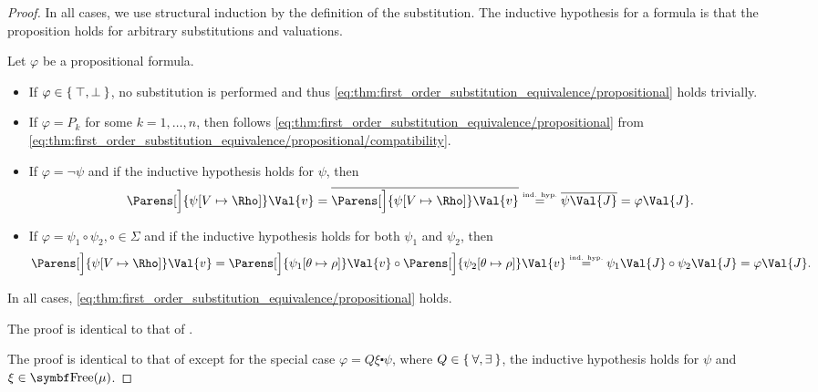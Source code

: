 \begin{proof}
  In all cases, we use structural induction by the definition of the substitution\IND. The inductive hypothesis for a formula is that the proposition holds for arbitrary substitutions and valuations.

   Let \( \varphi \) be a propositional formula.
  \begin{itemize}
    \item If \( \varphi \in \Set{ \top, \bot } \), no substitution is performed and thus \eqref{eq:thm:first_order_substitution_equivalence/propositional} holds trivially.

    \item If \( \varphi = P_k \) for some \( k = 1, \ldots, n \), then follows \eqref{eq:thm:first_order_substitution_equivalence/propositional} from \eqref{eq:thm:first_order_substitution_equivalence/propositional/compatibility}.

    \item If \( \varphi = \neg \psi \) and if the inductive hypothesis holds for \( \psi \), then
    \begin{equation*}
      \Parens[\Big]{ \psi[V \mapsto \Rho] }\Val{v}
      =
      \Ol{\Parens[\Big]{ \psi[V \mapsto \Rho] }\Val{v}}
      \overset {\IndHyp} =
      \Ol{\psi \Val{J}}
      =
      \varphi \Val{J}.
    \end{equation*}

    \item If \( \varphi = \psi_1 \circ \psi_2, \circ \in \Sigma \) and if the inductive hypothesis holds for both \( \psi_1 \) and \( \psi_2 \), then
    \begin{equation*}
      \Parens[\Big]{ \psi[V \mapsto \Rho] }\Val{v}
      =
      \Parens[\Big]{ \psi_1[\theta \mapsto \rho] }\Val{v} \circ \Parens[\Big]{ \psi_2[\theta \mapsto \rho] }\Val{v}
      \overset {\IndHyp} =
      \psi_1 \Val{J} \circ \psi_2\Val{J}
      =
      \varphi\Val{J}.
    \end{equation*}
  \end{itemize}

  In all cases, \eqref{eq:thm:first_order_substitution_equivalence/propositional} holds.

   The proof is identical to that of .

   The proof is identical to that of  except for the special case \( \varphi = Q \xi \centerdot \psi \), where \( Q \in \Set{ \forall, \exists } \), the inductive hypothesis holds for \( \psi \) and \( \xi \in \Bold{Free}(\mu) \).


\end{proof}
